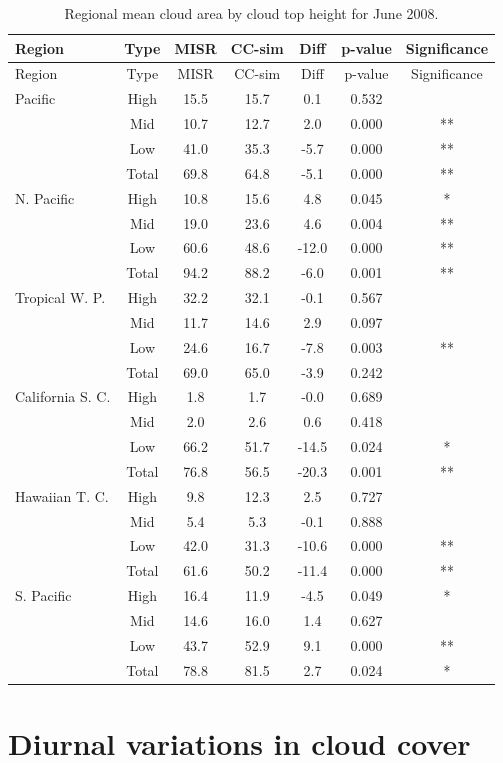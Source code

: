 \begin{longtable}[]{@{}lcccccc@{}}
\caption{\label{tbl:misr_cldmisr_table_june}Regional mean cloud area by
cloud top height for June 2008. }\tabularnewline
\toprule
Region & Type & MISR & CC-sim & Diff & p-value &
Significance\tabularnewline
\midrule
\endfirsthead
\toprule
Region & Type & MISR & CC-sim & Diff & p-value &
Significance\tabularnewline
\midrule
\endhead
Pacific & High & 15.5 & 15.7 & 0.1 & 0.532 &\tabularnewline
& Mid & 10.7 & 12.7 & 2.0 & 0.000 & **\tabularnewline
& Low & 41.0 & 35.3 & -5.7 & 0.000 & **\tabularnewline
& Total & 69.8 & 64.8 & -5.1 & 0.000 & **\tabularnewline
N. Pacific & High & 10.8 & 15.6 & 4.8 & 0.045 & *\tabularnewline
& Mid & 19.0 & 23.6 & 4.6 & 0.004 & **\tabularnewline
& Low & 60.6 & 48.6 & -12.0 & 0.000 & **\tabularnewline
& Total & 94.2 & 88.2 & -6.0 & 0.001 & **\tabularnewline
Tropical W. P. & High & 32.2 & 32.1 & -0.1 & 0.567 &\tabularnewline
& Mid & 11.7 & 14.6 & 2.9 & 0.097 &\tabularnewline
& Low & 24.6 & 16.7 & -7.8 & 0.003 & **\tabularnewline
& Total & 69.0 & 65.0 & -3.9 & 0.242 &\tabularnewline
California S. C. & High & 1.8 & 1.7 & -0.0 & 0.689 &\tabularnewline
& Mid & 2.0 & 2.6 & 0.6 & 0.418 &\tabularnewline
& Low & 66.2 & 51.7 & -14.5 & 0.024 & *\tabularnewline
& Total & 76.8 & 56.5 & -20.3 & 0.001 & **\tabularnewline
Hawaiian T. C. & High & 9.8 & 12.3 & 2.5 & 0.727 &\tabularnewline
& Mid & 5.4 & 5.3 & -0.1 & 0.888 &\tabularnewline
& Low & 42.0 & 31.3 & -10.6 & 0.000 & **\tabularnewline
& Total & 61.6 & 50.2 & -11.4 & 0.000 & **\tabularnewline
S. Pacific & High & 16.4 & 11.9 & -4.5 & 0.049 & *\tabularnewline
& Mid & 14.6 & 16.0 & 1.4 & 0.627 &\tabularnewline
& Low & 43.7 & 52.9 & 9.1 & 0.000 & **\tabularnewline
& Total & 78.8 & 81.5 & 2.7 & 0.024 & *\tabularnewline
\bottomrule
\end{longtable}

\section{Diurnal variations in cloud cover}\label{sec:misrDiurnal}

